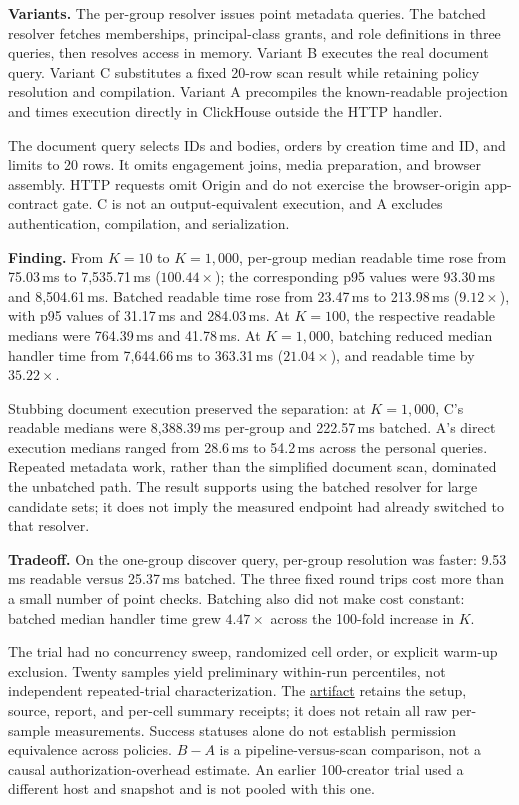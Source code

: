 \documentclass[sigconf, nonacm]{acmart}
\newcommand{\artifactbase}{https://github.com/jacoby149/web10}
\newcommand{\domainartifactrev}{26720acba859c7eb03fc5d26a6221cdde5b764a1}
\newcommand{\evidence}[2]{\href{\artifactbase/tree/\domainartifactrev/#1}{#2}}
\begin{document}
\textbf{Variants.} The per-group resolver issues point metadata queries.
The batched resolver fetches memberships, principal-class grants, and
role definitions in three queries, then resolves access in memory.
Variant B executes the real document query. Variant C substitutes a
fixed 20-row scan result while retaining policy resolution and
compilation. Variant A precompiles the known-readable projection and
times execution directly in ClickHouse outside the HTTP handler.

The document query selects IDs and bodies, orders by creation time and
ID, and limits to 20 rows. It omits engagement joins, media preparation,
and browser assembly. HTTP requests omit Origin and do not exercise the
browser-origin app-contract gate. C is not an output-equivalent
execution, and A excludes authentication, compilation, and serialization.

\textbf{Finding.} From $K=10$ to $K=1{,}000$, per-group median readable
time rose from 75.03\,ms to 7,535.71\,ms ($100.44\times$); the corresponding
p95 values were 93.30\,ms and 8,504.61\,ms. Batched readable time rose
from 23.47\,ms to 213.98\,ms ($9.12\times$), with p95 values of
31.17\,ms and 284.03\,ms. At $K=100$, the respective readable medians
were 764.39\,ms and 41.78\,ms. At $K=1{,}000$, batching reduced median
handler time from 7,644.66\,ms to 363.31\,ms ($21.04\times$), and readable
time by $35.22\times$.

Stubbing document execution preserved the separation: at $K=1{,}000$,
C's readable medians were 8,388.39\,ms per-group and 222.57\,ms batched.
A's direct execution medians ranged from 28.6\,ms to 54.2\,ms across the
personal queries. Repeated metadata work, rather than the simplified
document scan, dominated the unbatched path. The result supports using
the batched resolver for large candidate sets; it does not imply the
measured endpoint had already switched to that resolver.

\textbf{Tradeoff.} On the one-group discover query, per-group resolution
was faster: 9.53\,ms readable versus 25.37\,ms batched. The three fixed
round trips cost more than a small number of point checks. Batching also
did not make cost constant: batched median handler time grew
$4.47\times$ across the 100-fold increase in $K$.

The trial had no concurrency sweep, randomized cell order, or explicit
warm-up exclusion. Twenty samples yield preliminary within-run
percentiles, not independent repeated-trial characterization. The
\evidence{research/experiments/costfn}{artifact} retains the setup,
source, report, and per-cell summary receipts; it does not retain all
raw per-sample measurements. Success statuses alone do not establish
permission equivalence across policies. $B-A$ is a pipeline-versus-scan
comparison, not a causal authorization-overhead estimate. An earlier
100-creator trial used a different host and snapshot and is not pooled
with this one.
\end{document}
